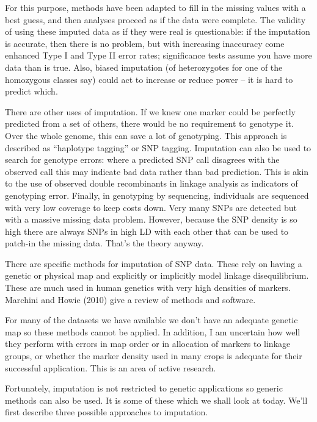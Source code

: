 \documentclass[
]{book}
\begin{document}
For this purpose, methods have been adapted to fill in the missing values with a best guess, and then analyses proceed as if the data were complete. The validity of using these imputed data as if they were real is questionable: if the imputation is accurate, then there is no problem, but with increasing inaccuracy come enhanced Type I and Type II error rates; significance tests assume you have more data than is true. Also, biased imputation (of heterozygotes for one of the homozygous classes say) could act to increase or reduce power -- it is hard to predict which.

There are other uses of imputation. If we knew one marker could be perfectly predicted from a set of others, there would be no requirement to genotype it. Over the whole genome, this can save a lot of genotyping. This approach is described as ``haplotype tagging'' or SNP tagging. Imputation can also be used to search for genotype errors: where a predicted SNP call disagrees with the observed call this may indicate bad data rather than bad prediction. This is akin to the use of observed double recombinants in linkage analysis as indicators of genotyping error. Finally, in genotyping by sequencing, individuals are sequenced with very low coverage to keep costs down. Very many SNPs are detected but with a massive missing data problem. However, because the SNP density is so high there are always SNPs in high LD with each other that can be used to patch-in the missing data. That's the theory anyway.

There are specific methods for imputation of SNP data. These rely on having a genetic or physical map and explicitly or implicitly model linkage disequilibrium. These are much used in human genetics with very high densities of markers. Marchini and Howie (2010) give a review of methods and software.

For many of the datasets we have available we don't have an adequate genetic map so these methods cannot be applied. In addition, I am uncertain how well they perform with errors in map order or in allocation of markers to linkage groups, or whether the marker density used in many crops is adequate for their successful application. This is an area of active research.

Fortunately, imputation is not restricted to genetic applications so generic methods can also be used. It is some of these which we shall look at today. We'll first describe three possible approaches to imputation.
\end{document}
